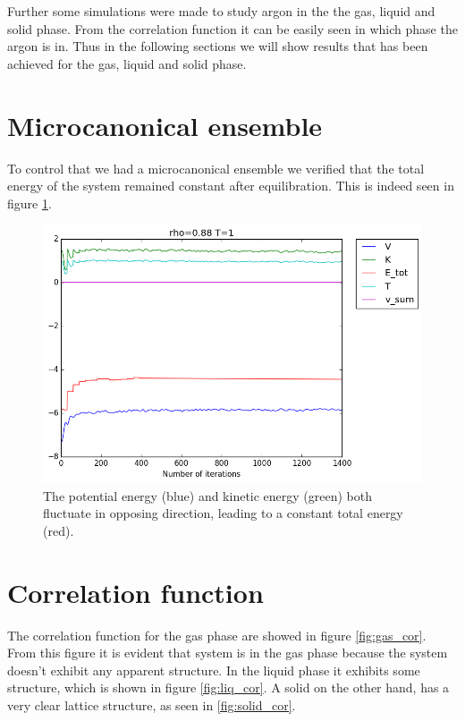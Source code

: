 \documentclass[12pt,a4paper]{report}
\begin{document}
Further some simulations were made to study argon in the the gas, liquid and solid phase. From the correlation function it can be easily seen in which phase the argon is  in. Thus in the following sections we will show results that has been achieved for the gas, liquid and solid phase.

\section{Microcanonical ensemble}

To control that we had a microcanonical ensemble we verified that the total energy of the system remained constant after equilibration. This is indeed seen in figure \ref{fig:all_rho}.

\begin{figure}[H]
\centering
\includegraphics[scale=0.5]{All_rho088_T1_rm35_2.png}
\caption{The potential energy (blue) and kinetic energy (green) both fluctuate in opposing direction, leading to a constant total energy (red).}
\label{fig:all_rho}
\end{figure}

\section{Correlation function}

The correlation function for the gas phase are showed in figure \ref{fig:gas_cor}. From this figure it is evident that system is in the gas phase because the system doesn't exhibit any apparent structure. In the liquid phase it exhibits some structure, which is shown in figure \ref{fig:liq_cor}. A solid on the other hand, has a very clear lattice structure, as seen in \ref{fig:solid_cor}.
\end{document}
